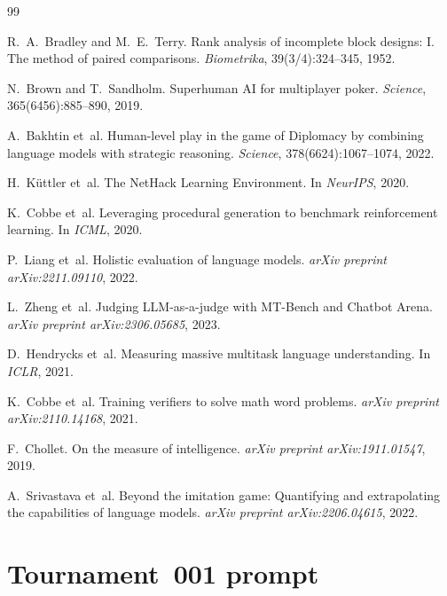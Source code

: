 \documentclass[11pt]{article}
\begin{document}
\begin{thebibliography}{99}

R.~A.~Bradley and M.~E.~Terry.
\newblock Rank analysis of incomplete block designs: {I}. {T}he method of paired comparisons.
\newblock \emph{Biometrika}, 39(3/4):324--345, 1952.

N.~Brown and T.~Sandholm.
\newblock Superhuman {AI} for multiplayer poker.
\newblock \emph{Science}, 365(6456):885--890, 2019.

A.~Bakhtin et~al.
\newblock Human-level play in the game of {D}iplomacy by combining language models with strategic reasoning.
\newblock \emph{Science}, 378(6624):1067--1074, 2022.

H.~K{\"u}ttler et~al.
\newblock The {N}et{H}ack {L}earning {E}nvironment.
\newblock In \emph{NeurIPS}, 2020.

K.~Cobbe et~al.
\newblock Leveraging procedural generation to benchmark reinforcement learning.
\newblock In \emph{ICML}, 2020.

P.~Liang et~al.
\newblock Holistic evaluation of language models.
\newblock \emph{arXiv preprint arXiv:2211.09110}, 2022.

L.~Zheng et~al.
\newblock Judging {LLM}-as-a-judge with {MT}-{B}ench and {C}hatbot {A}rena.
\newblock \emph{arXiv preprint arXiv:2306.05685}, 2023.

D.~Hendrycks et~al.
\newblock Measuring massive multitask language understanding.
\newblock In \emph{ICLR}, 2021.

K.~Cobbe et~al.
\newblock Training verifiers to solve math word problems.
\newblock \emph{arXiv preprint arXiv:2110.14168}, 2021.

F.~Chollet.
\newblock On the measure of intelligence.
\newblock \emph{arXiv preprint arXiv:1911.01547}, 2019.

A.~Srivastava et~al.
\newblock Beyond the imitation game: Quantifying and extrapolating the capabilities of language models.
\newblock \emph{arXiv preprint arXiv:2206.04615}, 2022.

\end{thebibliography}

\appendix

\section{Tournament~001 prompt}\label{app:t1_prompt}
\end{document}
